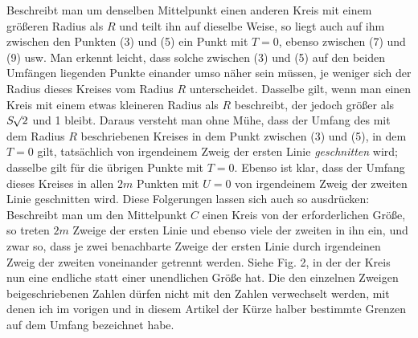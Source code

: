  Beschreibt man um denselben Mittelpunkt einen anderen Kreis mit einem größeren Radius als $R$ und teilt ihn auf dieselbe Weise, so liegt auch auf ihm zwischen den Punkten (3) und (5) ein Punkt mit $T=0$, ebenso zwischen (7) und (9) usw. Man erkennt leicht, dass solche zwischen (3) und (5) auf den beiden Umfängen liegenden Punkte einander umso näher sein müssen, je weniger sich der Radius dieses Kreises vom Radius $R$ unterscheidet. Dasselbe gilt, wenn man einen Kreis mit einem etwas kleineren Radius als $R$ beschreibt, der jedoch größer als $S\mathord{{}^{}\!\surd}2$ und 1 bleibt. Daraus versteht man ohne Mühe, dass der Umfang des mit dem Radius $R$ beschriebenen Kreises
in dem Punkt zwischen (3) und (5), in dem $T=0$ gilt, tatsächlich von irgendeinem Zweig der ersten Linie \textit{geschnitten} wird; dasselbe gilt für die übrigen Punkte mit $T=0$. Ebenso ist klar, dass der Umfang dieses Kreises in allen $2m$ Punkten mit $U=0$ von irgendeinem Zweig der zweiten Linie geschnitten wird. Diese Folgerungen lassen sich auch so ausdrücken: Beschreibt man um den Mittelpunkt $C$ einen Kreis von der erforderlichen Größe, so treten $2m$ Zweige der ersten Linie und ebenso viele der zweiten in ihn ein, und zwar so, dass je zwei benachbarte Zweige der ersten Linie durch irgendeinen Zweig der zweiten voneinander getrennt werden. Siehe Fig. 2, in der der Kreis nun eine endliche statt einer unendlichen Größe hat. Die den einzelnen Zweigen beigeschriebenen Zahlen dürfen nicht mit den Zahlen verwechselt werden, mit denen ich im vorigen und in diesem Artikel der Kürze halber bestimmte Grenzen auf dem Umfang bezeichnet habe.

